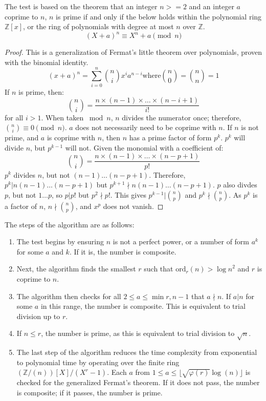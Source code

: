 \documentclass{article}
\begin{document}
The test is based on the theorem that an integer $n >= 2$ and an integer $a$ coprime to $n$, $n$ is prime if and only if the below holds within the polynomial ring $\mathbb{Z}[x]$, or the ring of polynomials with degree at most $n$ over $\mathbb{Z}$.
\[
    (X + a)^n \equiv X^n + a \pmod{n}
\]

\begin{proof} %
    This is a generalization of Fermat's little theorem over polynomials, proven with the binomial identity.
    \[
        (x + a)^n = \sum_{i=0}^{n} \binom{n}{i} x^i a^{n - i} \text{where} \binom{n}{0} = \binom{n}{n} = 1
    \]
    If $n$ is prime, then:
    \[
        \binom{n}{i} = \frac{n \times (n - 1) \times \ldots{} \times (n - i + 1)}{i!}
    \]
    for all $i > 1$. When taken $\bmod{n}$, $n$ divides the numerator once; therefore, $\binom{n}{i} \equiv 0 \pmod{n}$. $a$ does not necessarily need to be coprime with $n$.
    If $n$ is not prime, and $a$ is coprime with $n$, then $n$ has a prime factor of form $p^k$. $p^k$ will divide $n$, but $p^{k - 1}$ will not. Given the monomial with a coefficient of:
    \[
        \binom{n}{i} = \frac{n \times (n - 1) \times \ldots{} \times (n - p + 1)}{p!}
    \]
    $p^k$ divides $n$, but not $(n - 1) \ldots{} (n - p + 1)$. Therefore, $p^k \vert n (n - 1) \ldots{} (n - p + 1)$ but $p^{k + 1} \nmid n (n - 1) \ldots{} (n - p + 1)$. $p$ also divdes $p$, but not $1 \ldots p$, so $p \vert p!$ but $p^2 \nmid p!$. This gives $p^{k - 1} \vert \binom{n}{p}$ and $p^k \nmid \binom{n}{p}$. As $p^k$ is a factor of $n$, $n \nmid \binom{n}{p}$, and $x^p$ does not vanish.
\end{proof}

The steps of the algorithm are as follows:
\begin{enumerate}
    \item The test begins by ensuring $n$ is not a perfect power, or a number of form $a^k$ for some $a$ and $k$. If it is, the number is composite.
    \item Next, the algorithm finds the smallest $r$ such that $\textrm{ord}_r(n) > {\log{n}}^2$ and $r$ is coprime to $n$.
    \item The algorithm then checks for all $2 \leq a \leq \min{r, n - 1}$ that $a \nmid n$. If $a \vert n$ for some $a$ in this range, the number is composite. This is equivalent to trial division up to $r$.
    \item If $n \leq r$, the number is prime, as this is equivalent to trial division to $\sqrt{n}$.
    \item The last step of the algorithm reduces the time complexity from exponential to polynomial time by operating over the finite ring $(\mathbb{Z}/(n))[X] / (X^r - 1)$. Each $a$ from $1 \leq a \leq \lfloor \sqrt{\varphi(r)}\log(n) \rfloor$ is checked for the generalized Fermat's theorem. If it does not pass, the number is composite; if it passes, the number is prime.
\end{enumerate}
\end{document}
